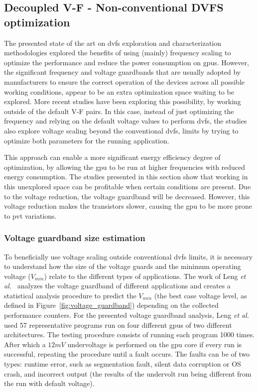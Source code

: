 \subsection{Decoupled V-F - Non-conventional DVFS optimization}
\label{section:decoupled}

The presented state of the art on \acrshort{dvfs} exploration and characterization methodologies explored the benefits of using (mainly) frequency scaling to optimize the performance and reduce the power consumption on \acrshort{gpu}s. However, the significant frequency and voltage guardbands that are usually adopted by manufacturers to ensure the correct operation of the devices across all possible working conditions, appear to be an extra optimization space waiting to be explored.  More recent studies have been exploring this possibility, by working outside of the default V-F pairs. In this case, instead of just optimizing the frequency and relying on the default voltage values to perform \acrshort{dvfs}, the studies also explore voltage scaling beyond the conventional \acrshort{dvfs}, limits by trying to optimize both parameters for the running application. 

This approach can enable a more significant energy efficiency degree of optimization, by allowing the \acrshort{gpu} to be run at higher frequencies with reduced energy consumption. 
The studies presented in this section show that working in this unexplored space can be profitable when certain conditions are present. Due to the voltage reduction, the voltage guardband will be decreased. However, this voltage reduction makes the transistors slower, causing the \acrshort{gpu} to be more prone to \acrshort{pvt} variations.

\subsubsection{Voltage guardband size estimation}

To beneficially use voltage scaling outside conventional \acrshort{dvfs} limits, it is necessary to understand how the size of the voltage guards and the minimum operating voltage ($V_{min}$) relate to the different types of applications.
The work of Leng \textit{et al.}~\cite{leng_safe_2015} analyzes the voltage guardband of different applications and creates a statistical analysis procedure to predict the $V_{min}$ (the best case voltage level, as defined in Figure~\ref{fig:voltage_guardband}) depending on the collected performance counters. For the presented voltage guardband analysis, Leng \textit{et al.} used 57 representative programs run on four different \acrshort{gpu}s of two different architectures. The testing procedure consists of running each program 1000 times. After which a $12mV$ undervoltage is performed on the \acrshort{gpu} core if every run is successful, repeating the procedure until a fault occurs. The faults can be of two types: runtime error, such as segmentation fault, silent data corruption or OS crash, and incorrect output (the results of the undervolt run being different from the run with default voltage). 

